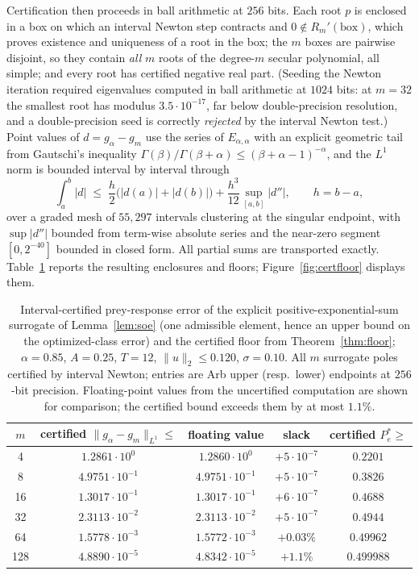 \documentclass[mathematics,article,accept,pdftex,moreauthors]{Definitions/mdpi}
\begin{document}
Certification then proceeds in ball arithmetic at $256$ bits. Each root $p$ is enclosed in a box on which an interval Newton step contracts and $0\notin R_{m}'(\text{box})$, which proves existence and uniqueness of a root in the box; the $m$ boxes are pairwise disjoint, so they contain \emph{all} $m$ roots of the degree-$m$ secular polynomial, all simple; and every root has certified negative real part. (Seeding the Newton iteration required eigenvalues computed in ball arithmetic at $1024$ bits: at $m=32$ the smallest root has modulus $3.5\cdot10^{-17}$, far below double-precision resolution, and a double-precision seed is correctly \emph{rejected} by the interval Newton test.) Point values of $d=g_{\alpha}-g_{m}$ use the series of $E_{\alpha,\alpha}$ with an explicit geometric tail from Gautschi's inequality $\Gamma(\beta)/\Gamma(\beta+\alpha)\le(\beta+\alpha-1)^{-\alpha}$, and the $L^{1}$ norm is bounded interval by interval through
\begin{equation}
\int_{a}^{b}|d|\;\le\;\frac{h}{2}\bigl(|d(a)|+|d(b)|\bigr)+\frac{h^{3}}{12}\sup_{[a,b]}|d''|,
\qquad h=b-a,
\label{eq:quad}
\end{equation}
over a graded mesh of $55{,}297$ intervals clustering at the singular endpoint, with $\sup|d''|$ bounded from term-wise absolute series and the near-zero segment $[0,2^{-40}]$ bounded in closed form. All partial sums are transported exactly. Table~\ref{tab:cert} reports the resulting enclosures and floors; Figure~\ref{fig:certfloor} displays them.

\begin{table}[H]
\caption{Interval-certified prey-response error of the explicit positive-exponential-sum surrogate of Lemma~\ref{lem:soe} (one admissible element, hence an upper bound on the optimized-class error) and the certified floor from Theorem~\ref{thm:floor}; $\alpha=0.85$, $A=0.25$, $T=12$, $\|u\|_{2}\le0.120$, $\sigma=0.10$. All $m$ surrogate poles certified by interval Newton; entries are Arb upper (resp.\ lower) endpoints at $256$-bit precision. Floating-point values from the uncertified computation are shown for comparison; the certified bound exceeds them by at most $1.1\%$.}
\label{tab:cert}
\begin{tabular}{ccccc}
\toprule
$m$ & certified $\|g_{\alpha}-g_{m}\|_{L^{1}}\le$ & floating value & slack & certified $P_{e}^{*}\ge$\\
\midrule
4   & $1.2861\cdot10^{0}$   & $1.2860\cdot10^{0}$  & $+5\cdot10^{-7}$ & $0.2201$\\
8   & $4.9751\cdot10^{-1}$  & $4.9751\cdot10^{-1}$ & $+5\cdot10^{-7}$ & $0.3826$\\
16  & $1.3017\cdot10^{-1}$  & $1.3017\cdot10^{-1}$ & $+6\cdot10^{-7}$ & $0.4688$\\
32  & $2.3113\cdot10^{-2}$  & $2.3113\cdot10^{-2}$ & $+5\cdot10^{-7}$ & $0.4944$\\
64  & $1.5778\cdot10^{-3}$  & $1.5772\cdot10^{-3}$ & $+0.03\%$        & $0.49962$\\
128 & $4.8890\cdot10^{-5}$  & $4.8342\cdot10^{-5}$ & $+1.1\%$         & $0.499988$\\
\bottomrule
\end{tabular}
\end{table}
\end{document}
